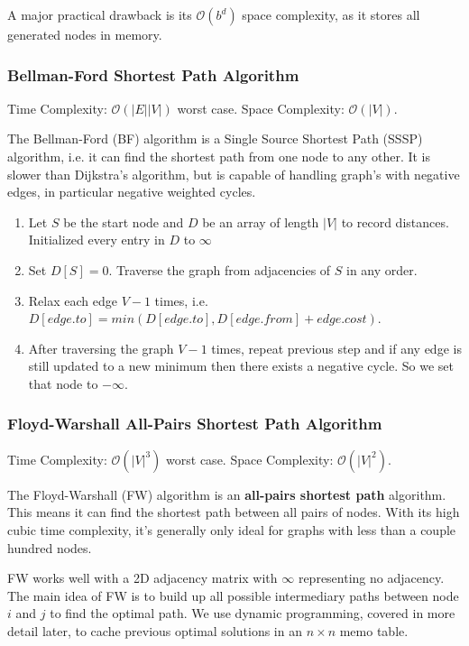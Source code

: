 \documentclass{article}
\newcommand{\bigO}{\mathcal{O}}
\begin{document}
    A major practical drawback is its $\bigO(b^d)$ space complexity, as it stores all generated nodes in memory.
   
    \subsubsection{Bellman-Ford Shortest Path Algorithm}
    Time Complexity: $\bigO (|E||V|)$ worst case. Space Complexity: $\bigO(|V|)$.
    
    The Bellman-Ford (BF) algorithm is a Single Source Shortest Path (SSSP) algorithm, i.e. it can find the shortest path from one node to any other. It is slower than Dijkstra's algorithm, but is capable of handling graph's with negative edges, in particular negative weighted cycles.
    \begin{enumerate}
        \item Let $S$ be the start node and $D$ be an array of length $|V|$ to record distances. Initialized every entry in $D$ to $\infty$
        \item Set $D[S] = 0$. Traverse the graph from adjacencies of $S$ in any order. 
        \item Relax each edge $V-1$ times, i.e. $D[edge.to] = min(D[edge.to], D[edge.from] + edge.cost)$.
        \item After traversing the graph $V-1$ times, repeat previous step and if any edge is still updated to a new minimum then there exists a negative cycle. So we set that node to $-\infty$.
    \end{enumerate}
    
    
    \subsubsection{Floyd-Warshall All-Pairs Shortest Path Algorithm}
    Time Complexity: $\bigO(|V|^3)$ worst case. Space Complexity: $\bigO(|V|^2)$.
    
    The Floyd-Warshall (FW) algorithm is an \textbf{all-pairs shortest path} algorithm. This means it can find the shortest path between all pairs of nodes. With its high cubic time complexity, it's generally only ideal for graphs with less than a couple hundred nodes.
    
    FW works well with a 2D adjacency matrix with $\infty$ representing no adjacency. The main idea of FW is to build up all possible intermediary paths between node $i$ and $j$ to find the optimal path. We use dynamic programming, covered in more detail later, to cache previous optimal solutions in an $n\times n$ memo table. 
    
\end{document}
